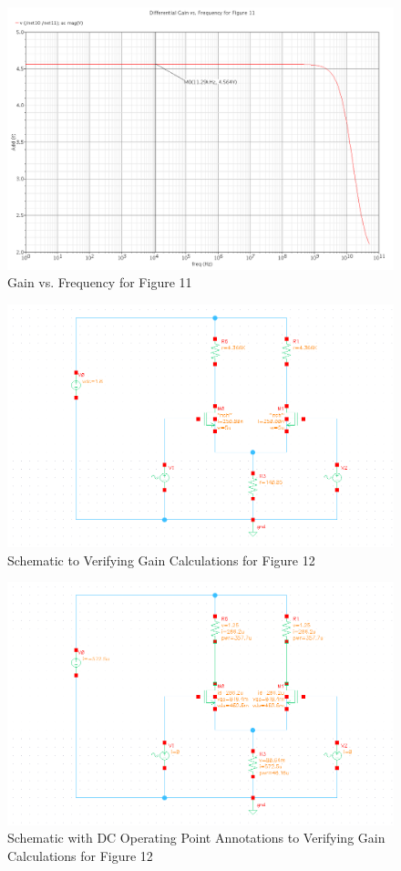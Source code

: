\documentclass{article}
\begin{document}
\begin{figure}[H]
\centering
\includegraphics[width=6in]{p3_1a_gain}
\caption{Gain vs. Frequency for Figure 11}
\label{3_1a_gain}
\end{figure}

\begin{figure}[H]
\centering
\includegraphics[width=6in]{p3_1b_schem}
\caption{Schematic to Verifying Gain Calculations for Figure 12}
\label{3_1b_schem}
\end{figure}

\begin{figure}[H]
\centering
\includegraphics[width=6in]{p3_1b_dcop}
\caption{Schematic with DC Operating Point Annotations to Verifying Gain Calculations for Figure 12}
\label{3_1b_dcop}
\end{figure}
\end{document}
